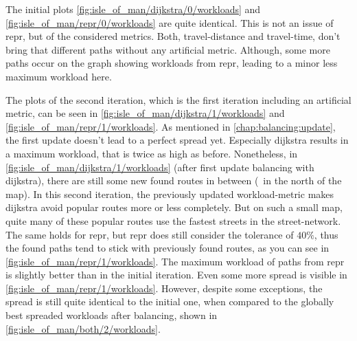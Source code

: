         The initial plots \cref{fig:isle_of_man/dijkstra/0/workloads} and \cref{fig:isle_of_man/repr/0/workloads} are quite identical.
        This is not an issue of \gls{repr}, but of the considered \glspl{metric}.
        Both, travel-distance and travel-time, don't bring that different paths without any artificial \gls{metric}.
        Although, some more paths occur on the graph showing workloads from \gls{repr}, leading to a minor less maximum workload here.

        The plots of the second iteration, which is the first iteration including an artificial \gls{metric}, can be seen in \cref{fig:isle_of_man/dijkstra/1/workloads} and \vref{fig:isle_of_man/repr/1/workloads}.
        As mentioned in \cref{chap:balancing:update}, the first update doesn't lead to a perfect spread yet.
        Especially \gls{dijkstra} results in a maximum workload, that is twice as high as before.
        Nonetheless, in \cref{fig:isle_of_man/dijkstra/1/workloads} (after first update \gls{balancing} with \gls{dijkstra}), there are still some new found routes in between (\eg\ in the north of the map).
        In this second iteration, the previously updated workload-\gls{metric} makes \gls{dijkstra} avoid popular routes more or less completely.
        But on such a small map, quite many of these popular routes use the fastest streets in the street-network.
        The same holds for \gls{repr}, but \gls{repr} does still consider the tolerance of $\si{40 \percent}$, thus the found paths tend to stick with previously found routes, as you can see in \cref{fig:isle_of_man/repr/1/workloads}.
        The maximum workload of paths from \gls{repr} is slightly better than in the initial iteration.
        Even some more spread is visible in \cref{fig:isle_of_man/repr/1/workloads}.
        However, despite some exceptions, the spread is still quite identical to the initial one, when compared to the globally best spreaded workloads after \gls{balancing}, shown in \vref{fig:isle_of_man/both/2/workloads}.

